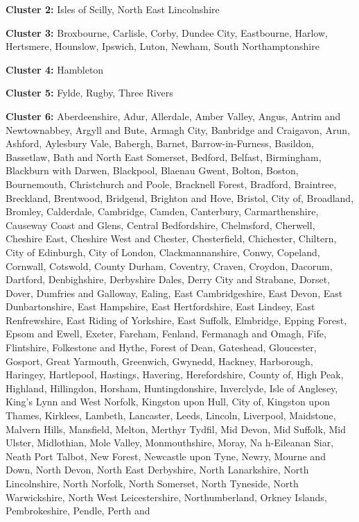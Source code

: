 \documentclass[]{interact}
\theoremstyle{plain}%
\theoremstyle{definition}
\theoremstyle{remark}
\begin{document}
\textbf{Cluster 2: } Isles of Scilly, North East Lincolnshire

\textbf{Cluster 3: } Broxbourne, Carlisle, Corby, Dundee City,
Eastbourne, Harlow, Hertsmere, Hounslow, Ipswich, Luton, Newham, South
Northamptonshire

\textbf{Cluster 4: } Hambleton

\textbf{Cluster 5: } Fylde, Rugby, Three Rivers

\textbf{Cluster 6: } Aberdeenshire, Adur, Allerdale, Amber Valley,
Angus, Antrim and Newtownabbey, Argyll and Bute, Armagh City, Banbridge
and Craigavon, Arun, Ashford, Aylesbury Vale, Babergh, Barnet,
Barrow-in-Furness, Basildon, Bassetlaw, Bath and North East Somerset,
Bedford, Belfast, Birmingham, Blackburn with Darwen, Blackpool, Blaenau
Gwent, Bolton, Boston, Bournemouth, Christchurch and Poole, Bracknell
Forest, Bradford, Braintree, Breckland, Brentwood, Bridgend, Brighton
and Hove, Bristol, City of, Broadland, Bromley, Calderdale, Cambridge,
Camden, Canterbury, Carmarthenshire, Causeway Coast and Glens, Central
Bedfordshire, Chelmsford, Cherwell, Cheshire East, Cheshire West and
Chester, Chesterfield, Chichester, Chiltern, City of Edinburgh, City of
London, Clackmannanshire, Conwy, Copeland, Cornwall, Cotswold, County
Durham, Coventry, Craven, Croydon, Dacorum, Dartford, Denbighshire,
Derbyshire Dales, Derry City and Strabane, Dorset, Dover, Dumfries and
Galloway, Ealing, East Cambridgeshire, East Devon, East Dunbartonshire,
East Hampshire, East Hertfordshire, East Lindsey, East Renfrewshire,
East Riding of Yorkshire, East Suffolk, Elmbridge, Epping Forest, Epsom
and Ewell, Exeter, Fareham, Fenland, Fermanagh and Omagh, Fife,
Flintshire, Folkestone and Hythe, Forest of Dean, Gateshead, Gloucester,
Gosport, Great Yarmouth, Greenwich, Gwynedd, Hackney, Harborough,
Haringey, Hartlepool, Hastings, Havering, Herefordshire, County of, High
Peak, Highland, Hillingdon, Horsham, Huntingdonshire, Inverclyde, Isle
of Anglesey, King's Lynn and West Norfolk, Kingston upon Hull, City of,
Kingston upon Thames, Kirklees, Lambeth, Lancaster, Leeds, Lincoln,
Liverpool, Maidstone, Malvern Hills, Mansfield, Melton, Merthyr Tydfil,
Mid Devon, Mid Suffolk, Mid Ulster, Midlothian, Mole Valley,
Monmouthshire, Moray, Na h-Eileanan Siar, Neath Port Talbot, New Forest,
Newcastle upon Tyne, Newry, Mourne and Down, North Devon, North East
Derbyshire, North Lanarkshire, North Lincolnshire, North Norfolk, North
Somerset, North Tyneside, North Warwickshire, North West Leicestershire,
Northumberland, Orkney Islands, Pembrokeshire, Pendle, Perth and
\end{document}
